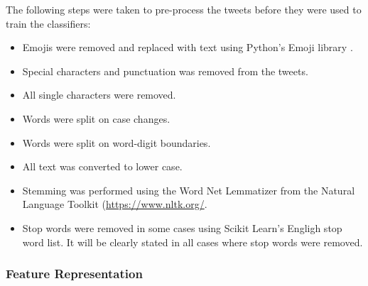 The following steps were taken to pre-process the tweets before they were used to train the classifiers:
\begin{itemize}
    \item Emojis were removed and replaced with text using Python's Emoji library \cite{emoji}.
    \item Special characters and punctuation was removed from the tweets. 
    \item All single characters were removed.
    \item Words were split on case changes.
    \item Words were split on word-digit boundaries.
    \item All text was converted to lower case.
    \item Stemming was performed using the Word Net Lemmatizer from the Natural Language Toolkit (\url{https://www.nltk.org/}.
    \item Stop words were removed in some cases using Scikit Learn's Engligh stop word list. It will be clearly stated in all cases where stop words were removed.
\end{itemize}

\subsubsection{Feature Representation}

